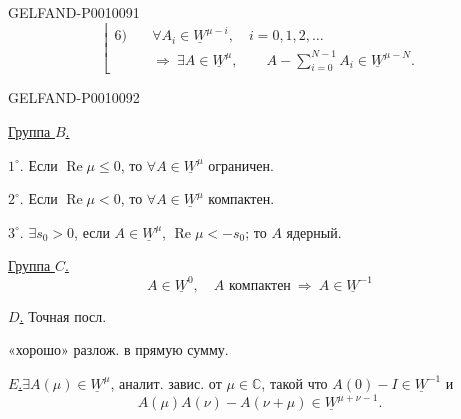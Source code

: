 \begin{GelfandAdjacentEvidence}{GELFAND-P001009}{1}
\[
\left\lfloor
\begin{aligned}
6)\quad&\forall A_i\in\underline W^{\mu-i},\quad i=0,1,2,\ldots\\
&\Longrightarrow\ \exists A\in\underline W^\mu,\qquad
A-\sum_{i=0}^{N-1}A_i\in\underline W^{\mu-N}.
\end{aligned}\right.
\]
\end{GelfandAdjacentEvidence}
\begin{GelfandAdjacentEvidence}{GELFAND-P001009}{2}


\underline{Группа $B$.}

$1^{\circ}$. Если $\operatorname{Re}\mu\leq0$, то $\forall A\in\underline W^\mu$ ограничен.

$2^{\circ}$. Если $\operatorname{Re}\mu<0$, то $\forall A\in\underline W^\mu$ компактен.

$3^{\circ}$. $\exists s_0>0$, если $A\in\underline W^\mu$,
$\operatorname{Re}\mu<-s_0$; то $A$ ядерный.

\underline{Группа $C$.}
\[
A\in\underline W^0,\quad A\text{ компактен}
\ \Longrightarrow\ A\in\underline W^{-1}
\]

\underline{$D$.} Точная посл.

\end{GelfandAdjacentEvidence}


«хорошо» разлож. в прямую сумму.

\underline{$E$.}\qquad $\exists A(\mu)\in\underline W^\mu$, аналит. завис. от $\mu\in\mathbb C$,
такой что $A(0)-I\in\underline W^{-1}$ и
\[
A(\mu)A(\nu)-A(\nu+\mu)\in\underline W^{\mu+\nu-1}.
\]


